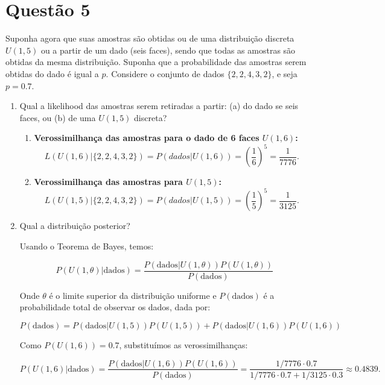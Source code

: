 \documentclass[12 pt]{article}
\begin{document}
\section*{Questão 5}
Suponha agora que suas amostras são obtidas ou de uma distribuição discreta $U(1, 5)$ ou a partir de um dado (seis faces), sendo que todas as amostras são obtidas da mesma distribuição. Suponha que a probabilidade das amostras serem obtidas do dado é igual a $p$. Considere o conjunto de dados $\{2, 2, 4, 3, 2\}$, e seja $p = 0.7$.
\begin{enumerate}
    \newpage
    \item Qual a likelihood das amostras serem retiradas a partir: (a) do dado se seis faces, ou (b) de uma $U(1, 5)$ discreta?
    \begin{tcolorbox}[colback=white, colframe=black, title=Resposta:]
        \begin{enumerate}
            \item \textbf{Verossimilhança das amostras para o dado de 6 faces \( U(1,6) \):}
            \[
            L(  U(1,6) | \{2, 2, 4, 3, 2\}) = P(dados | U(1,6)) = \left( \frac{1}{6} \right)^5 = \frac{1}{7776}.
            \]
        
            \item \textbf{Verossimilhança das amostras para \( U(1,5) \):}
            \[
            L(  U(1,5) | \{2, 2, 4, 3, 2\}) = P(dados | U(1,5)) = \left( \frac{1}{5} \right)^5 = \frac{1}{3125}.
            \]
        \end{enumerate}
    \end{tcolorbox}
    \item Qual a distribuição posterior?
    \begin{tcolorbox}[colback=white, colframe=black, title=Resposta:]
        Usando o Teorema de Bayes, temos:

        \[
        P(U(1,\theta) | \text{dados}) = \frac{P(\text{dados} | U(1,\theta)) P(U(1,\theta))}{P(\text{dados})}
        \]
        
        Onde $\theta$ é o limite superior da distribuição uniforme e \( P(\text{dados}) \) é a probabilidade total de observar os dados, dada por:
    
        \[
        P(\text{dados}) = P(\text{dados} | U(1,5)) P(U(1,5)) + P(\text{dados} | U(1,6)) P(U(1,6))
        \]
    
        Como \( P(U(1,6)) = 0.7 \), substituímos as verossimilhanças:
    
        \[
        P(U(1,6) | \text{dados}) = \frac{P(\text{dados} | U(1,6)) P(U(1,6))}{P(\text{dados})} = \frac{1/7776 \cdot 0.7}{1/7776 \cdot 0.7 + 1/3125 \cdot 0.3} \approx 0.4839.
        \]
    

\end{tcolorbox}
\end{enumerate}
\end{document}

